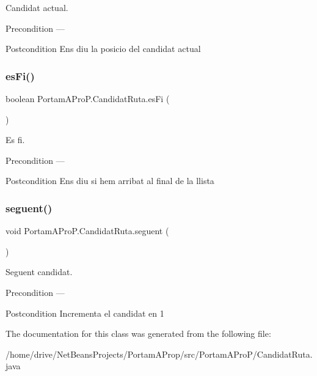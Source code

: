 Candidat actual. 

\begin{DoxyPrecond}{Precondition}
--- 
\end{DoxyPrecond}
\begin{DoxyPostcond}{Postcondition}
Ens diu la posicio del candidat actual 
\end{DoxyPostcond}
\mbox{\label{class_portam_a_pro_p_1_1_candidat_ruta_a549265167fa19ae4845edf342f9e2671}} 
\subsubsection{\texorpdfstring{es\+Fi()}{esFi()}}
{\footnotesize\ttfamily boolean Portam\+A\+Pro\+P.\+Candidat\+Ruta.\+es\+Fi (\begin{DoxyParamCaption}{ }\end{DoxyParamCaption})}



Es fi. 

\begin{DoxyPrecond}{Precondition}
--- 
\end{DoxyPrecond}
\begin{DoxyPostcond}{Postcondition}
Ens diu si hem arribat al final de la llista 
\end{DoxyPostcond}
\mbox{\label{class_portam_a_pro_p_1_1_candidat_ruta_a174caa14ac06161023eddb0660974e64}} 
\subsubsection{\texorpdfstring{seguent()}{seguent()}}
{\footnotesize\ttfamily void Portam\+A\+Pro\+P.\+Candidat\+Ruta.\+seguent (\begin{DoxyParamCaption}{ }\end{DoxyParamCaption})}



Seguent candidat. 

\begin{DoxyPrecond}{Precondition}
--- 
\end{DoxyPrecond}
\begin{DoxyPostcond}{Postcondition}
Incrementa el candidat en 1 
\end{DoxyPostcond}


The documentation for this class was generated from the following file\+:\begin{DoxyCompactItemize}
\item 
/home/drive/\+Net\+Beans\+Projects/\+Portam\+A\+Prop/src/\+Portam\+A\+Pro\+P/Candidat\+Ruta.\+java\end{DoxyCompactItemize}
